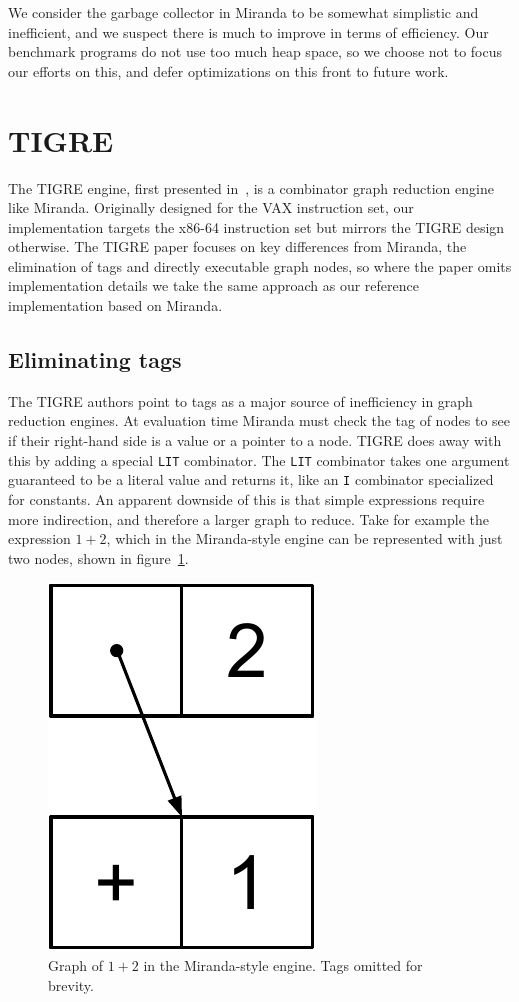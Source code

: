 \documentclass[conference]{IEEEtran}
\begin{document}
We consider the garbage collector in Miranda to be somewhat simplistic and inefficient, and we suspect there is much to improve in terms of efficiency.
Our benchmark programs do not use too much heap space, so we choose not to focus our efforts on this, and defer optimizations on this front to future work.

\section{TIGRE}
\label{sec:tigre}
The TIGRE engine, first presented in~\cite{koopman_fresh_1989}, is a combinator graph reduction engine like Miranda.
Originally designed for the VAX instruction set, our implementation targets the x86-64 instruction set but mirrors the TIGRE design otherwise.
The TIGRE paper focuses on key differences from Miranda, the elimination of tags and directly executable graph nodes, so where the paper omits implementation details we take the same approach as our reference implementation based on Miranda.

\subsection{Eliminating tags}
The TIGRE authors point to tags as a major source of inefficiency in graph reduction engines.
At evaluation time Miranda must check the tag of nodes to see if their right-hand side is a value or a pointer to a node.
TIGRE does away with this by adding a special \texttt{LIT} combinator.
The \texttt{LIT} combinator takes one argument guaranteed to be a literal value and returns it, like an \texttt{I} combinator specialized for constants.
An apparent downside of this is that simple expressions require more indirection, and therefore a larger graph to reduce.
Take for example the expression $1+2$, which in the Miranda-style engine can be represented with just two nodes, shown in figure~\ref{fig:1_plus_2_miranda}.

\begin{figure}
    \includegraphics[width=.2\columnwidth]{1_plus_2_miranda}
    \centering
    \caption{
        Graph of $1 + 2$ in the Miranda-style engine.
        Tags omitted for brevity.
    }
    \label{fig:1_plus_2_miranda}
\end{figure}
\end{document}
